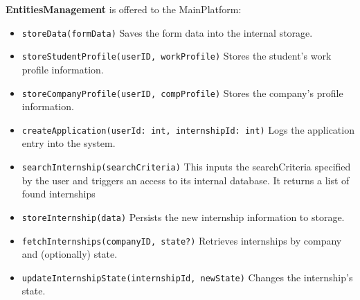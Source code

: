 \textbf{EntitiesManagement} is offered to the MainPlatform:
\begin{itemize}
    \item \texttt{storeData(formData)} Saves the form data into the internal storage.
    \item \texttt{storeStudentProfile(userID, workProfile)} Stores the student’s work profile information.
    \item \texttt{storeCompanyProfile(userID, compProfile)} Stores the company’s profile information.
    \item \texttt{createApplication(userId: int, internshipId: int)} Logs the application entry into the system.
    \item \texttt{searchInternship(searchCriteria)}
    This inputs the searchCriteria specified by the user and triggers an access to its internal database. It returns a list of found internships
    \item \texttt{storeInternship(data)} Persists the new internship information to storage.
    \item \texttt{fetchInternships(companyID, state?)} Retrieves internships by company and (optionally) state.
    \item \texttt{updateInternshipState(internshipId, newState)} Changes the internship’s state.
\end{itemize}



